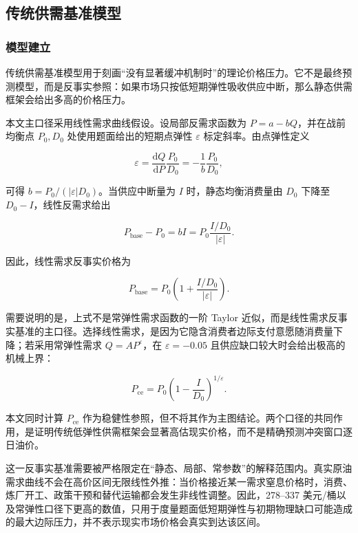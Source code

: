 \subsection{传统供需基准模型}

\subsubsection{模型建立}

传统供需基准模型用于刻画“没有显著缓冲机制时”的理论价格压力。它不是最终预测模型，而是反事实参照：如果市场只按低短期弹性吸收供应中断，那么静态供需框架会给出多高的价格压力。

本文主口径采用线性需求曲线假设。设局部反需求函数为 \(P=a-bQ\)，并在战前均衡点 \(P_0,D_0\) 处使用题面给出的短期点弹性 \(\varepsilon\) 标定斜率。由点弹性定义

\begin{equation}
  \varepsilon
  =
  \frac{\mathrm d Q}{\mathrm d P}\frac{P_0}{D_0}
  =
  -\frac{1}{b}\frac{P_0}{D_0},
\end{equation}

可得 \(b=P_0/(|\varepsilon|D_0)\)。当供应中断量为 \(I\) 时，静态均衡消费量由 \(D_0\) 下降至 \(D_0-I\)，线性反需求给出

\begin{equation}
  P_{\mathrm{base}}-P_0
  =
  bI
  =
  P_0\frac{I/D_0}{|\varepsilon|}.
\end{equation}

因此，线性需求反事实价格为

\begin{equation}
  P_{\mathrm{base}}
  =
  P_0
  \left(
    1+\frac{I/D_0}{|\varepsilon|}
  \right).
\end{equation}

需要说明的是，上式不是常弹性需求函数的一阶 Taylor 近似，而是线性需求反事实基准的主口径。选择线性需求，是因为它隐含消费者边际支付意愿随消费量下降；若采用常弹性需求 \(Q=A P^\varepsilon\)，在 \(\varepsilon=-0.05\) 且供应缺口较大时会给出极高的机械上界：

\begin{equation}
  P_{\mathrm{ce}}
  =
  P_0
  \left(
    1-\frac{I}{D_0}
  \right)^{1/\varepsilon}.
\end{equation}

本文同时计算 \(P_{\mathrm{ce}}\) 作为稳健性参照，但不将其作为主图结论。两个口径的共同作用，是证明传统低弹性供需框架会显著高估现实价格，而不是精确预测冲突窗口逐日油价。

这一反事实基准需要被严格限定在“静态、局部、常参数”的解释范围内。真实原油需求曲线不会在高价区间无限线性外推：当价格接近某一需求窒息价格时，消费、炼厂开工、政策干预和替代运输都会发生非线性调整。因此，278--337 美元/桶以及常弹性口径下更高的数值，只用于度量题面低短期弹性与初期物理缺口可能造成的最大边际压力，并不表示现实市场价格会真实到达该区间。

